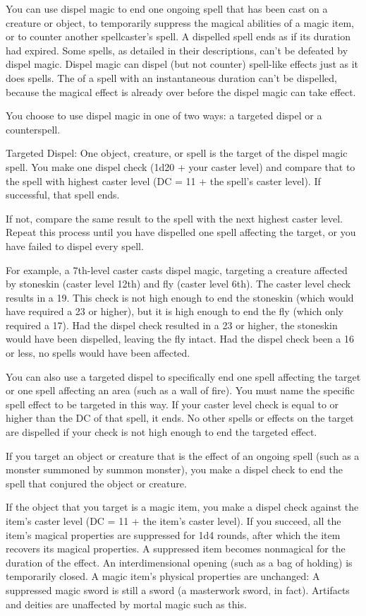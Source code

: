 {You can use dispel magic to end one ongoing spell that has been cast on a creature or object, to temporarily suppress the magical abilities of a magic item, or to counter another spellcaster's spell. A dispelled spell ends as if its duration had expired. Some spells, as detailed in their descriptions, can't be defeated by dispel magic. Dispel magic can dispel (but not counter) spell-like effects just as it does spells. The of a spell with an instantaneous duration can't be dispelled, because the magical effect is already over before the dispel magic can take effect.

You choose to use dispel magic in one of two ways: a targeted dispel or a counterspell.

Targeted Dispel: One object, creature, or spell is the target of the dispel magic spell. You make one dispel check (1d20 + your caster level) and compare that to the spell with highest caster level (DC = 11 + the spell's caster level). If successful, that spell ends.

If not, compare the same result to the spell with the next highest caster level. Repeat this process until you have dispelled one spell affecting the target, or you have failed to dispel every spell.

For example, a 7th-level caster casts dispel magic, targeting a creature affected by stoneskin (caster level 12th) and fly (caster level 6th). The caster level check results in a 19. This check is not high enough to end the stoneskin (which would have required a 23 or higher), but it is high enough to end the fly (which only required a 17). Had the dispel check resulted in a 23 or higher, the stoneskin would have been dispelled, leaving the fly intact. Had the dispel check been a 16 or less, no spells would have been affected.

You can also use a targeted dispel to specifically end one spell affecting the target or one spell affecting an area (such as a wall of fire). You must name the specific spell effect to be targeted in this way. If your caster level check is equal to or higher than the DC of that spell, it ends. No other spells or effects on the target are dispelled if your check is not high enough to end the targeted effect.

If you target an object or creature that is the effect of an ongoing spell (such as a monster summoned by summon monster), you make a dispel check to end the spell that conjured the object or creature.

If the object that you target is a magic item, you make a dispel check against the item's caster level (DC = 11 + the item's caster level). If you succeed, all the item's magical properties are suppressed for 1d4 rounds, after which the item recovers its magical properties. A suppressed item becomes nonmagical for the duration of the effect. An interdimensional opening (such as a bag of holding) is temporarily closed. A magic item's physical properties are unchanged: A suppressed magic sword is still a sword (a masterwork sword, in fact). Artifacts and deities are unaffected by mortal magic such as this.

}
